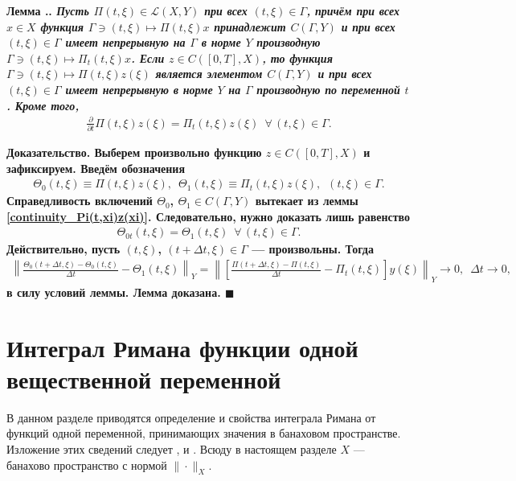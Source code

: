 \documentclass{report}
\newcounter{lem}[section]
\renewcommand{\thelem}{\thesection.\arabic{lem}}
\newenvironment{Lemma}{\par\refstepcounter{lem}\bf Лемма \thelem. \it}{\rm\par}
\newenvironment{Proof}{\par\noindent\bf Доказательство.\rm}{ $\blacksquare$\par}
\begin{document}
\begin{Lemma}\label{differentiability_Pi(t,xi)z(xi)}
Пусть $\Pi(t,\xi)\in\mathcal{L}(X,Y)$ при всех $(t,\xi)\in\Gamma$, причём при всех $x\in X$ функция $\Gamma\ni(t,\xi)\mapsto\Pi(t,\xi)x$ принадлежит $C(\Gamma,Y)$ и при всех
$(t,\xi)\in\Gamma$ имеет непрерывную на $\Gamma$ в норме $Y$ производную $\Gamma\ni(t,\xi)\mapsto\Pi_t(t,\xi)x$. Если $z\in C([0,T],X)$, то функция $\Gamma\ni(t,\xi)\mapsto\Pi(t,\xi)z(\xi)$
является элементом $C(\Gamma,Y)$ и  при всех $(t,\xi)\in\Gamma$ имеет непрерывную в норме $Y$ на $\Gamma$ производную по переменной $t$. Кроме того,
\begin{gather*}
\frac{\partial}{\partial t}\Pi(t,\xi)z(\xi)=\Pi_t(t,\xi)z(\xi)\,\,\,\forall\,(t,\xi)\in\Gamma.
\end{gather*}
\end{Lemma}
\begin{Proof} Выберем произвольно функцию $z\in C([0,T],X)$ и зафиксируем. Введём обозначения
\begin{gather*}
\Theta_0(t,\xi)\equiv\Pi(t,\xi)z(\xi),\,\,\,\Theta_1(t,\xi)\equiv\Pi_t(t,\xi)z(\xi),\,\,\,(t,\xi)\in\Gamma.
\end{gather*}
Справедливость включений $\Theta_0$, $\Theta_1\in C(\Gamma,Y)$ вытекает из леммы \ref{continuity_Pi(t,xi)z(xi)}. Следовательно, нужно доказать лишь равенство
\begin{gather*}
\Theta_{0t}(t,\xi)=\Theta_1(t,\xi)\,\,\,\forall\,(t,\xi)\in\Gamma.
\end{gather*}
Действительно, пусть $(t,\xi)$, $(t+\Delta t,\xi)\in\Gamma$ --- произвольны. Тогда
\begin{gather*}
\left\|\frac{\Theta_0(t+\Delta t,\xi)-\Theta_0(t,\xi)}{\Delta t}-\Theta_1(t,\xi)\right\|_Y= \left\|\left[\frac{\Pi(t+\Delta t,\xi)-\Pi(t,\xi)}{\Delta t}-\Pi_t(t,\xi)\right]y(\xi)
\right\|_Y\to0,\,\,\,\Delta t\to0,
\end{gather*}
в силу условий леммы. Лемма доказана.
\end{Proof}


        \section{Интеграл Римана функции одной вещественной переменной}
В данном разделе приводятся определение и свойства интеграла Римана от функций одной переменной, принимающих значения в банаховом пространстве. Изложение этих сведений следует
\cite[\S23]{KudryavtsevT1}, \cite[\S25]{Trenogin} и \cite{ZorichTomI}. Всюду в настоящем разделе $X$ --- банахово пространство с нормой $\|\cdot\|_X$.
\end{document}
